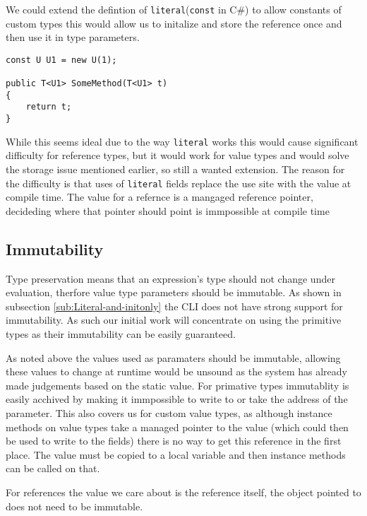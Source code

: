 We could extend the defintion of \texttt{literal}(\texttt{const} in C\#) to allow constants of custom types this would allow us to 
initalize and store the reference once and then use it in type parameters.

\begin{lstlisting}[caption={Literal refernces},keywordstyle={\color{blue}},language=sharpc]
const U U1 = new U(1);

public T<U1> SomeMethod(T<U1> t)
{
	return t;
}
\end{lstlisting}

While this seems ideal due to the way \texttt{literal} works this would cause significant difficulty for reference types,
but it would work for value types and would solve the storage issue mentioned earlier, so still a wanted extension.
The reason for the difficulty is that uses of \texttt{literal} fields replace the use site with the value at compile time. 
The value for a refernce is a mangaged reference pointer, decideding where that pointer should point is immpossible at compile time

\subsection{Immutability}

Type preservation means that an expression's type should not change
under evaluation, therfore value type parameters should be immutable.
As shown in subsection \ref{sub:Literal-and-initonly} the CLI does
not have strong support for immutability. As such our initial work
will concentrate on using the primitive types as their immutability
can be easily guaranteed.

As noted above the values used as paramaters should be immutable, allowing these values to change at runtime would be unsound 
as the system has already made judgements based on the static value. For primative types immutablity is easily acchived by making 
it immpossible to write to or take the address of the parameter. This also covers us for custom value types, as although instance 
methods on value types take a managed pointer to the value (which could then be used to write to the fields) there is no way to
get this reference in the first place. The value must be copied to a local variable and then instance methods can be called on that.

For references the value we care about is the reference itself, the object pointed to does not need to be immutable.

